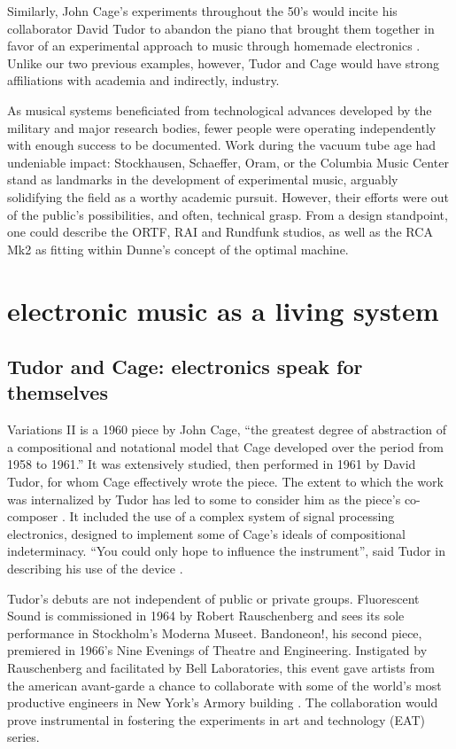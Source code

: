 Similarly, John Cage’s experiments throughout the 50’s would incite his collaborator David Tudor to abandon the piano that brought them together in favor of an experimental approach to music through homemade electronics \cite{holzaepfel1993,collins2004}. Unlike our two previous examples, however, Tudor and Cage would have strong affiliations with academia and indirectly, industry. 

As musical systems beneficiated from technological advances developed by the military and major research bodies, fewer people were operating independently with enough success to be documented. Work during the vacuum tube age had undeniable impact: Stockhausen, Schaeffer, Oram, or the Columbia Music Center stand as landmarks in the development of experimental music, arguably solidifying the field as a worthy academic pursuit. However, their efforts were out of the public's possibilities, and often, technical grasp. From a design standpoint, one could describe the ORTF, RAI and Rundfunk studios, as well as the RCA Mk2 as fitting within Dunne's concept of the optimal machine. 

\section{electronic music as a living system}

\subsection{Tudor and Cage: electronics speak for themselves}

	Variations II is a 1960 piece by John Cage, “the greatest degree of abstraction of a compositional and notational model that Cage developed over the period from 1958 to 1961.” It was extensively studied, then performed in 1961 by David Tudor, for whom Cage effectively wrote the piece. The extent to which the work was internalized by Tudor has led to some to consider him as the piece’s co-composer \cite{pritchett2004}. It included the use of a complex system of signal processing electronics, designed to implement some of Cage’s ideals of compositional indeterminacy. “You could only hope to influence the instrument”, said Tudor in describing his use of the device \cite{nakai2014}. 

Tudor’s debuts are not independent of public or private groups. Fluorescent Sound is commissioned in 1964 by Robert Rauschenberg and sees its sole performance in Stockholm’s Moderna Museet. Bandoneon!, his second piece, premiered in 1966’s Nine Evenings of Theatre and Engineering. Instigated by Rauschenberg and facilitated by Bell Laboratories, this event gave artists from the american avant-garde a chance to collaborate with some of the world’s most productive engineers in New York’s Armory building \cite{kuivila2004}. The collaboration would prove instrumental in fostering the experiments in art and technology (EAT) series. 
	

